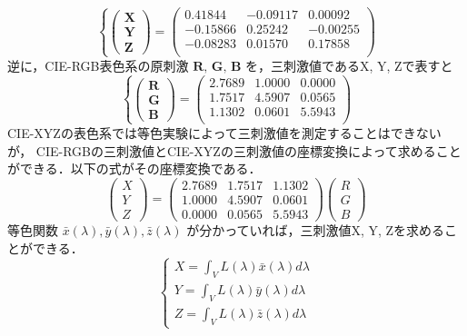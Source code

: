\documentclass[
]{article}
\begin{document}
\begin{equation}
\left\{
\begin{pmatrix}
\textbf{X} \\
\textbf{Y} \\
\textbf{Z}
\end{pmatrix}
=
\begin{pmatrix}
0.41844 &  -0.09117 & 0.00092 \\
-0.15866 & 0.25242 & -0.00255 \\
-0.08283 & 0.01570 & 0.17858 \\
\end{pmatrix}
\right. 
\end{equation}
 逆に，CIE-RGB表色系の原刺激 \(\textbf{R, G, B}\) を，三刺激値であるX,
Y, Zで表すと
\begin{equation}
\left\{
\begin{pmatrix}
\textbf{R} \\
\textbf{G} \\
\textbf{B}
\end{pmatrix}
= 
\begin{pmatrix}
2.7689 & 1.0000 & 0.0000 \\
1.7517 & 4.5907 & 0.0565 \\
1.1302 & 0.0601 & 5.5943 \\
\end{pmatrix}
\right.
\end{equation}
CIE-XYZの表色系では等色実験によって三刺激値を測定することはできないが，
CIE-RGBの三刺激値とCIE-XYZの三刺激値の座標変換によって求めることができる．以下の式がその座標変換である．
\begin{equation}
\begin{pmatrix}
X \\
Y \\
Z
\end{pmatrix}
= 
\begin{pmatrix}
2.7689 & 1.7517 & 1.1302 \\
1.0000 & 4.5907 & 0.0601 \\
0.0000 & 0.0565 & 5.5943 
\end{pmatrix}
\begin{pmatrix}
R \\
G \\
B
\end{pmatrix}
\end{equation}
等色関数 \(\bar{x}(\lambda), \bar{y}(\lambda), \bar{z}(\lambda)\)
が分かっていれば，三刺激値X, Y, Zを求めることができる． 
\begin{equation}
\left\{
\begin{aligned}
X = \int_V L(\lambda)\bar{x}(\lambda)d\lambda \\
Y = \int_V L(\lambda)\bar{y}(\lambda)d\lambda \\
Z = \int_V L(\lambda)\bar{z}(\lambda)d\lambda
\end{aligned}
\right.
\end{equation}
\end{document}
